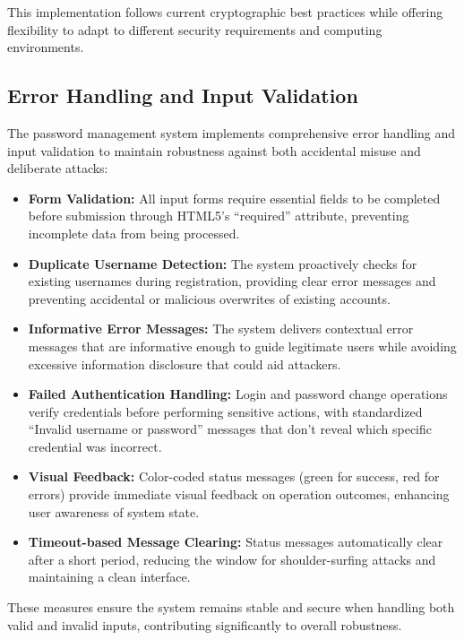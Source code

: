 \documentclass[11pt,a4paper]{article}
\begin{document}
This implementation follows current cryptographic best practices while offering flexibility to adapt to different security requirements and computing environments.

\subsection{Error Handling and Input Validation}

The password management system implements comprehensive error handling and input validation to maintain robustness against both accidental misuse and deliberate attacks:

\begin{itemize}
   \item \textbf{Form Validation:} All input forms require essential fields to be completed before submission through HTML5's ``required'' attribute, preventing incomplete data from being processed.
   
   \item \textbf{Duplicate Username Detection:} The system proactively checks for existing usernames during registration, providing clear error messages and preventing accidental or malicious overwrites of existing accounts.
   
   \item \textbf{Informative Error Messages:} The system delivers contextual error messages that are informative enough to guide legitimate users while avoiding excessive information disclosure that could aid attackers.
   
   \item \textbf{Failed Authentication Handling:} Login and password change operations verify credentials before performing sensitive actions, with standardized ``Invalid username or password'' messages that don't reveal which specific credential was incorrect.
   
   \item \textbf{Visual Feedback:} Color-coded status messages (green for success, red for errors) provide immediate visual feedback on operation outcomes, enhancing user awareness of system state.
   
   \item \textbf{Timeout-based Message Clearing:} Status messages automatically clear after a short period, reducing the window for shoulder-surfing attacks and maintaining a clean interface.
\end{itemize}

These measures ensure the system remains stable and secure when handling both valid and invalid inputs, contributing significantly to overall robustness.
\end{document}
